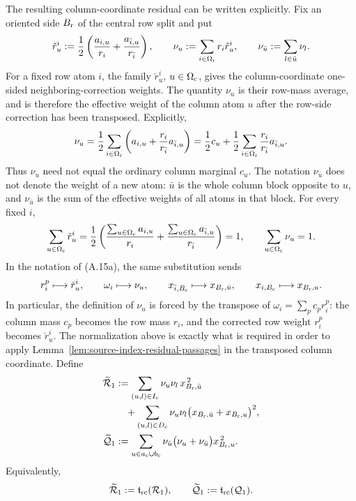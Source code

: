 \documentclass[11pt]{article}
\begin{document}
The resulting column-coordinate residual can be written explicitly.  Fix an
oriented side $B_{\rm r}$ of the central row split and put
\[
 \check r_u^i
 :=\frac12\left(
 \frac{a_{i,u}}{r_i}+\frac{a_{\bar i,u}}{r_{\bar i}}
 \right),
 \qquad
 \nu_u:=\sum_{i\in\Omega_{\rm r}}r_i\check r_u^i,
 \qquad
 \nu_{\bar u}:=\sum_{l\in\bar u}\nu_l.
\]
For a fixed row atom $i$, the family $\check r_u^i$,
$u\in\Omega_{\rm c}$, gives the column-coordinate one-sided
neighboring-correction weights.  The quantity $\nu_u$ is their
row-mass average, and is therefore the effective weight of the column atom
$u$ after the row-side correction has been transposed.  Explicitly,
\[
 \nu_u
 =\frac12\sum_{i\in\Omega_{\rm r}}
 \left(a_{i,u}+\frac{r_i}{r_{\bar i}}a_{\bar i,u}\right)
 =\frac12c_u+\frac12\sum_{i\in\Omega_{\rm r}}
 \frac{r_i}{r_{\bar i}}a_{\bar i,u}.
\]
Thus $\nu_u$ need not equal the ordinary column marginal $c_u$.  The notation
$\nu_{\bar u}$ does not denote the weight of a new atom: $\bar u$ is the
whole column block opposite to $u$, and $\nu_{\bar u}$ is the sum of the
effective weights of all atoms in that block.
For every fixed $i$,
\[
 \sum_{u\in\Omega_{\rm c}}\check r_u^i
 =\frac12\left(
 \frac{\sum_{u\in\Omega_{\rm c}}a_{i,u}}{r_i}
 +\frac{\sum_{u\in\Omega_{\rm c}}a_{\bar i,u}}{r_{\bar i}}
 \right)=1,
 \qquad
 \sum_{u\in\Omega_{\rm c}}\nu_u=1.
\]
In the notation of (A.15a), the same substitution sends
\[
 r_i^p\longmapsto\check r_u^i,\qquad
 \omega_i\longmapsto\nu_u,\qquad
 x_{\bar i,B_{\rm c}}\longmapsto x_{B_{\rm r},\bar u},\qquad
 x_{i,B_{\rm c}}\longmapsto x_{B_{\rm r},u}.
\]
In particular, the definition of $\nu_u$ is forced by the transpose of
$\omega_i=\sum_pc_pr_i^p$: the column mass $c_p$ becomes the row mass $r_i$,
and the corrected row weight $r_i^p$ becomes $\check r_u^i$.  The
normalization above is exactly what is required in order to apply
Lemma~\ref{lem:source-index-residual-passages} in the transposed column
coordinate.
Define
\[
\begin{aligned}
\widetilde{\mathcal R}_1
&:=
\sum_{(u,l)\in I_{\rm c}}\nu_u\nu_l\,x_{B_{\rm r},\bar u}^{\,2}\\
&\quad+
\sum_{(u,l)\in D_{\rm c}}\nu_u\nu_l
 \bigl(x_{B_{\rm r},\bar u}+x_{B_{\rm r},u}\bigr)^2,\\
\widetilde{\mathcal Q}_1
&:=
\sum_{u\in a_{\rm c}\cup b_{\rm c}}
\nu_{\bar u}\bigl(\nu_u+\nu_{\bar u}\bigr)x_{B_{\rm r},u}^{\,2}.
\end{aligned}
\]
Equivalently,
\[
 \widetilde{\mathcal R}_1
 :=\mathfrak t_{\rm rc}(\mathcal R_1),
 \qquad
 \widetilde{\mathcal Q}_1
 :=\mathfrak t_{\rm rc}(\mathcal Q_1).
\]
\end{document}

